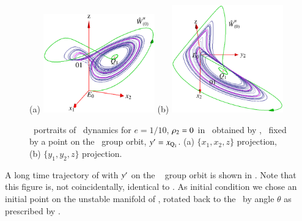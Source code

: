 %
\begin{figure}[ht]
\begin{center}
(a) \includegraphics[width=0.43\textwidth]{../figs/CLEperpReqb1}
(b) \includegraphics[width=0.43\textwidth]{../figs/CLEperpReqb}
\end{center}
\caption{
\Statesp\ portraits of \CLe\ dynamics for $e=1/10$,
$\rho_2=0$ in \reducedsp\ obtained by {\Mframes}, 
\slice\ fixed by a point on the
\reqv\ group orbit, ${y'}  = x_{\mathrm{Q}_{1}}$.
(a) $\{x_1,x_2,z\}$ projection,
(b) $\{y_1,y_2,z\}$ projection.
}
\label{fig:CLEpcSect}
\end{figure}
%
A long time trajectory of  with
${y'}$ on the \reqv\  group orbit is shown in
. Note that this figure is, not coincidentally,
identical to .
As initial condition we chose an initial point on the unstable manifold
of , rotated back to the \slice\ by angle $\theta$ as
prescribed by . 

